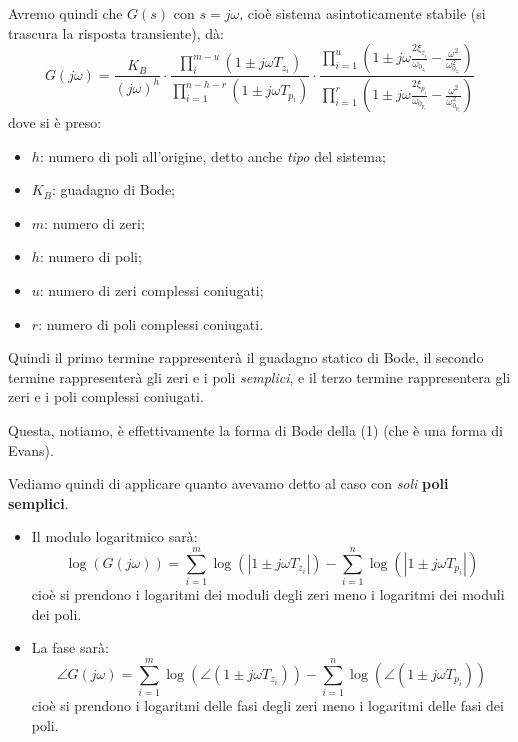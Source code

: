 \documentclass[a4paper,11pt]{article}
\begin{document}
Avremo quindi che $G(s)$ con $s = j\omega$, cioè sistema asintoticamente stabile (si trascura la risposta transiente), dà:
$$
G(j \omega) = \frac{K_B}{(j \omega)^h} 
\cdot
\frac{ \prod_{i}^{m - u} (1 \pm j \omega T_{z_i}) }{ \prod_{i = 1}^{n - h - r} (1 \pm j \omega T_{p_i}) } 
\cdot
\frac{ \prod_{i = 1}^u \left( 1 \pm j \omega \frac{ 2 \xi_{z_i} }{\omega_{0_{z_i}}} - \frac{\omega^2}{\omega_{0_{z_i}}^2} \right) }{ \prod_{i = 1}^r \left( 1 \pm j \omega \frac{ 2 \xi_{p_i} }{\omega_{0_{p_i}}} - \frac{\omega^2}{\omega_{0_{p_i}}^2} \right) }
$$
dove si è preso:
\begin{itemize}
	\item $h$: numero di poli all'origine, detto anche \textit{tipo} del sistema; 
	\item $K_B$: guadagno di Bode;
	\item $m$: numero di zeri;
	\item $h$: numero di poli;
	\item $u$: numero di zeri complessi coniugati;
	\item $r$: numero di poli complessi coniugati.
\end{itemize}

Quindi il primo termine rappresenterà il guadagno statico di Bode, il secondo termine rappresenterà gli zeri e i poli \textit{semplici}, e il terzo termine rappresentera gli zeri e i poli complessi coniugati.

Questa, notiamo, è effettivamente la forma di Bode della (1) (che è una forma di Evans). 

Vediamo quindi di applicare quanto avevamo detto al caso con \textit{soli} \textbf{poli semplici}.
\begin{itemize}
	\item 
Il modulo logaritmico sarà:
$$
\log \left( G(j \omega) \right) = \sum_{i = 1}^{m} \log \left( |1 \pm j \omega T_{z_i}| \right) - \sum_{i = 1}^{n} \log \left( |1 \pm j \omega T_{p_i}| \right)
$$
cioè si prendono i logaritmi dei moduli degli zeri meno i logaritmi dei moduli dei poli. 

\item 
La fase sarà:
$$
\angle G(j \omega) = \sum_{i = 1}^{m} \log \left( \angle \left( 1 \pm j \omega T_{z_i} \right) \right) - \sum_{i = 1}^{n} \log \left( \angle \left( 1 \pm j \omega T_{p_i} \right) \right)
$$
cioè si prendono i logaritmi delle fasi degli zeri meno i logaritmi delle fasi dei poli. 
\end{itemize}

\par\bigskip
\end{document}
